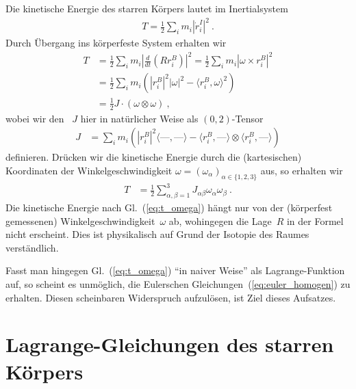 \documentclass[10pt,a4paper]{article}
\newcommand{\mydef}[1]{\textls{#1}}
\newcommand{\nul}{\textrm{---}}
\begin{document}
Die kinetische Energie des starren Körpers lautet im Inertialsystem
\begin{align}
	T = \frac{1}{2}\sum_i m_i 
	\left|
		\dot{r}_i^I
	\right|^2
	\ .
\end{align}
Durch Übergang ins körperfeste System erhalten wir
\begin{align}
	T &= 
	\frac{1}{2}\sum_i m_i 
	\left|
		\frac{d}{dt}
		\left(
			Rr_i^B
		\right)
	\right|^2
	=
	\frac{1}{2}\sum_i m_i 
	\left|
		\omega\times r_i^B
	\right|^2
	\nonumber\\
	&=
	\frac{1}{2}\sum_i m_i
	\left(
	\left|r_i^B\right|^2
	\left|\omega\right|^2	
	- 
	\langle
		r_i^B,\omega
	\rangle^2
	\right)
	\nonumber\\
	&=
	\frac{1}{2} J\cdot(\omega\otimes\omega)
	\ ,
\end{align}
wobei wir den \mydef{Trägheitstensor}~$J$ hier in natürlicher Weise als $(0,2)$-Tensor
\begin{align}
\label{eq:j_02}
	J &=
	\sum_i m_i
	\left(
	\left|r_i^B\right|^2
	\langle\nul,\nul\rangle
	- 
	\langle
		r_i^B,\nul
	\rangle
	\otimes
	\langle
		r_i^B,\nul
	\rangle
	\right)	
\end{align}
definieren.
Drücken wir die kinetische Energie durch die (kartesischen) Koordinaten der Winkelgeschwindigkeit $\omega=(\omega_\alpha)_{\alpha\in\{1,2,3\}}$ aus,
so erhalten wir
\begin{align}
\label{eq:t_omega}
	T &= \frac{1}{2} \sum_{\alpha,\beta=1}^3 J_{\alpha\beta}\omega_\alpha\omega_\beta
	\ .
\end{align}
Die kinetische Energie nach Gl.~(\ref{eq:t_omega}) hängt nur von der (körperfest gemessenen) Winkelgeschwindigkeit~$\omega$ ab, wohingegen die Lage~$R$ in der Formel nicht erscheint.
Dies ist physikalisch auf Grund der Isotopie des Raumes verständlich.

Fasst man hingegen Gl.~(\ref{eq:t_omega}) ``in naiver Weise'' als Lagrange-Funktion auf, so scheint es unmöglich, die Eulerschen Gleichungen~(\ref{eq:euler_homogen}) zu erhalten.
Diesen scheinbaren Widerspruch aufzulösen, ist Ziel dieses Aufsatzes.

\section{Lagrange-Gleichungen des starren Körpers}
\end{document}
